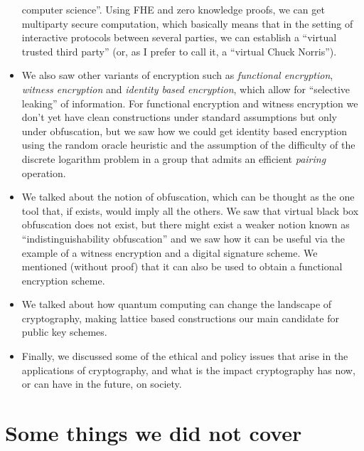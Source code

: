 \begin{itemize}
  computer science''. Using FHE and zero knowledge proofs, we can get
  multiparty secure computation, which basically means that in the
  setting of interactive protocols between several parties, we can
  establish a ``virtual trusted third party'' (or, as I prefer to call
  it, a ``virtual Chuck Norris'').
\item
  We also saw other variants of encryption such as \emph{functional
  encryption}, \emph{witness encryption} and \emph{identity based
  encryption}, which allow for ``selective leaking'' of information. For
  functional encryption and witness encryption we don't yet have clean
  constructions under standard assumptions but only under obfuscation,
  but we saw how we could get identity based encryption using the random
  oracle heuristic and the assumption of the difficulty of the discrete
  logarithm problem in a group that admits an efficient \emph{pairing}
  operation.
\item
  We talked about the notion of obfuscation, which can be thought as the
  one tool that, if exists, would imply all the others. We saw that
  virtual black box obfuscation does not exist, but there might exist a
  weaker notion known as ``indistinguishability obfuscation'' and we saw
  how it can be useful via the example of a witness encryption and a
  digital signature scheme. We mentioned (without proof) that it can
  also be used to obtain a functional encryption scheme.
\item
  We talked about how quantum computing can change the landscape of
  cryptography, making lattice based constructions our main candidate
  for public key schemes.
\item
  Finally, we discussed some of the ethical and policy issues that arise
  in the applications of cryptography, and what is the impact
  cryptography has now, or can have in the future, on society.
\end{itemize}

\section{Some things we did not cover}\label{26-Some-things-we-did-not}

